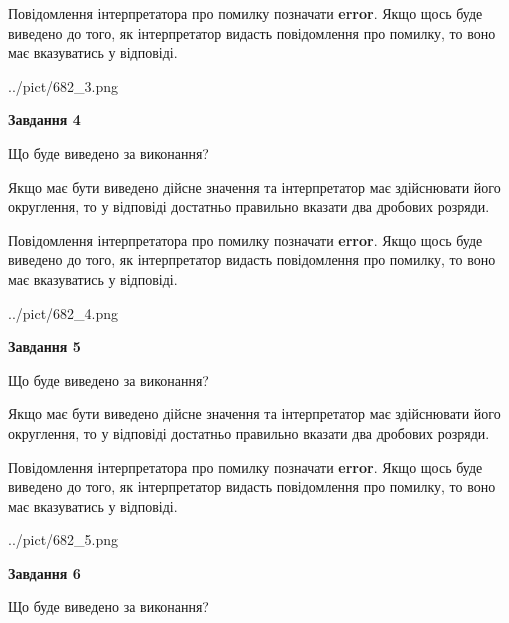 \documentclass[12pt, ukrainian]{article}
\begin{document}
{\begin {Large}
Повідомлення інтерпретатора про помилку позначати \textbf{error}.
Якщо щось буде виведено до того, як інтерпретатор видасть повідомлення про помилку, 
то воно має вказуватись у відповіді. \par

\begin{center}
	{../pict/682_3.png}
\end{center}
\newpage

{\begin {center}\textbf{Завдання 4}\end {center}}\par
Що буде виведено за виконання? \par

Якщо має бути виведено дійсне значення та інтерпретатор має здійснювати його округлення, 
то у відповіді достатньо правильно вказати два дробових розряди.

Повідомлення інтерпретатора про помилку позначати \textbf{error}.
Якщо щось буде виведено до того, як інтерпретатор видасть повідомлення про помилку, 
то воно має вказуватись у відповіді. \par

\begin{center}
	{../pict/682_4.png}
\end{center}
\newpage

{\begin {center}\textbf{Завдання 5}\end {center}}\par
Що буде виведено за виконання? \par

Якщо має бути виведено дійсне значення та інтерпретатор має здійснювати його округлення, 
то у відповіді достатньо правильно вказати два дробових розряди.

Повідомлення інтерпретатора про помилку позначати \textbf{error}.
Якщо щось буде виведено до того, як інтерпретатор видасть повідомлення про помилку, 
то воно має вказуватись у відповіді. \par

\begin{center}
	{../pict/682_5.png}
\end{center}
\newpage

{\begin {center}\textbf{Завдання 6}\end {center}}\par
Що буде виведено за виконання? \par


\end{Large}}
\end{document}

